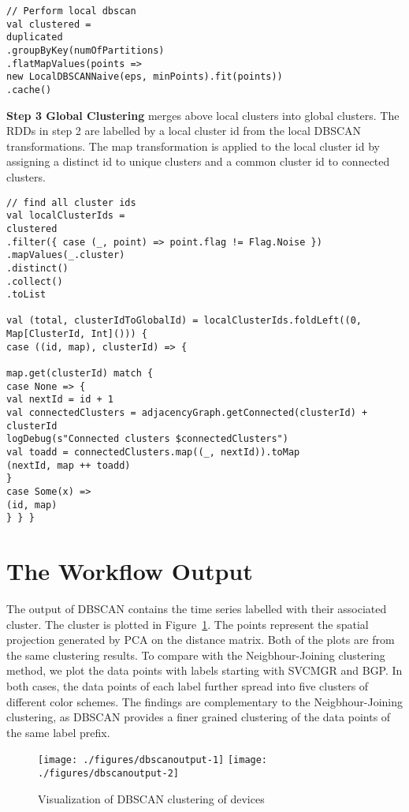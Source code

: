 \begin{lstlisting}[style=myScalastyle,caption={Local DBSCAN},captionpos=b]
// Perform local dbscan
val clustered =
duplicated
.groupByKey(numOfPartitions)
.flatMapValues(points =>
new LocalDBSCANNaive(eps, minPoints).fit(points))
.cache()
\end{lstlisting}



\textbf{Step 3 Global Clustering} merges above local clusters into global clusters. The RDDs in step 2 are labelled by a local cluster \textsf{id} from the local DBSCAN  transformations. The \textsf{map} transformation is applied to the local cluster \textsf{id} by assigning a distinct \textsf{id} to unique clusters and a common cluster \textsf{id} to connected clusters. 

\begin{lstlisting}[style=myScalastyle,caption={Global Clusters generation source code snippet},captionpos=b]	
// find all cluster ids
val localClusterIds =
clustered
.filter({ case (_, point) => point.flag != Flag.Noise })
.mapValues(_.cluster)
.distinct()
.collect()
.toList

val (total, clusterIdToGlobalId) = localClusterIds.foldLeft((0, Map[ClusterId, Int]())) {
case ((id, map), clusterId) => {

map.get(clusterId) match {
case None => {
val nextId = id + 1
val connectedClusters = adjacencyGraph.getConnected(clusterId) + clusterId
logDebug(s"Connected clusters $connectedClusters")
val toadd = connectedClusters.map((_, nextId)).toMap
(nextId, map ++ toadd)
}
case Some(x) =>
(id, map)
} } }
\end{lstlisting}



\section{The Workflow Output}

The output of DBSCAN contains the time series labelled with their associated cluster. The cluster is plotted in Figure~\ref{Fig:dbscan-vis}. The points represent the spatial projection generated by PCA on the distance matrix. Both of the plots are from the same clustering results. To compare with the Neigbhour-Joining clustering method, we plot the data points with labels starting with \textsf{SVCMGR} and \textsf{BGP}. In both cases, the data points of each label further spread into five clusters of different color schemes. 
The findings are complementary to the Neigbhour-Joining clustering, as DBSCAN provides a finer grained clustering of the data points of the same label prefix.  


\begin{figure}
    \centering
	\texttt{[image: ./figures/dbscanoutput-1]}
	\texttt{[image: ./figures/dbscanoutput-2]}
	\caption{Visualization of DBSCAN clustering of devices}
	\label{Fig:dbscan-vis}
\end{figure}

